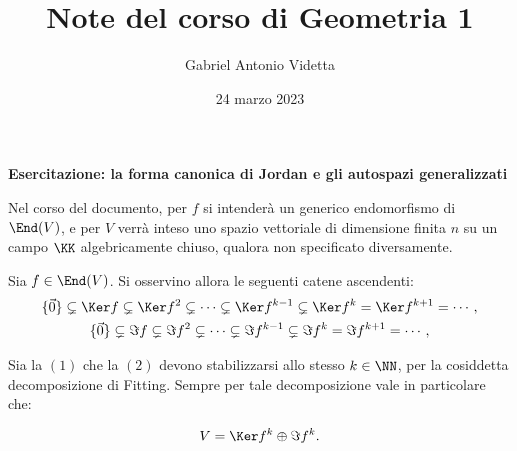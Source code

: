 \documentclass[11pt]{article}
\title{\textbf{Note del corso di Geometria 1}}
\author{Gabriel Antonio Videtta}
\date{24 marzo 2023}
\begin{document}
	
	\maketitle
	
	\begin{center}
		\Large \textbf{Esercitazione: la forma canonica di Jordan e gli autospazi generalizzati}
	\end{center}

	\begin{note}
		Nel corso del documento, per $f$ si intenderà un generico endomorfismo di $\End(V)$, e per $V$
		verrà inteso uno spazio vettoriale di dimensione finita $n$ su un campo $\KK$ algebricamente
		chiuso, qualora non specificato diversamente.
	\end{note}
	
	Sia $f \in \End(V)$. Si osservino allora le seguenti catene ascendenti:
	\begin{gather}
		\{\vec0\} \subsetneq \Ker f \subsetneq \Ker f^2 \subsetneq \cdots \subsetneq \Ker f^{k-1} \subsetneq \Ker f^k = \Ker f^{k+1} = \cdots, \\
		\{\vec0\} \subsetneq \Im f \subsetneq \Im f^2 \subsetneq \cdots \subsetneq \Im f^{k-1} \subsetneq \Im f^k = \Im f^{k+1} = \cdots,
	\end{gather}

	Sia la $(1)$ che la $(2)$ devono stabilizzarsi allo stesso $k \in \NN$, per la cosiddetta decomposizione di Fitting.
	Sempre per tale decomposizione vale in particolare che:
	
	\[ V = \Ker f^k \oplus \Im f^k. \]
	
\end{document}
